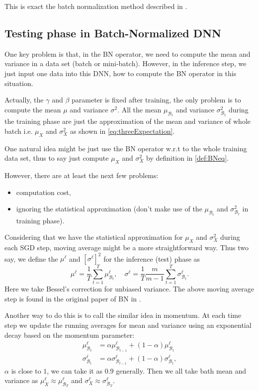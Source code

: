 This is exact the batch normalization method described in \cite{ioffe2015batch}.


\subsection{Testing phase in Batch-Normalized DNN}
One key problem is that, in the BN operator, we need to compute the mean and variance 
in a data set (batch or mini-batch). However, in the inference step, we just input one data 
into this DNN, how to compute the BN operator in this situation. 

Actually,  the $\gamma$ and $\beta$ parameter is fixed after training, the only problem is
to compute the mean $\mu$ and variance $\sigma^2$. 
All the mean $ \mu_{\mathcal B_t}  $ and variance $\sigma^2_{\mathcal B_t} $ during the training phase 
are just the approximation of the mean and variance of whole batch i.e.  $ \mu_{X}  $ and $\sigma^2_{X}$ 
as shown in \eqref{eq:threeExpectation}. 

One natural idea might be just use the BN operator w.r.t to the whole training data set, thus to say
just compute $\mu_X$ and $\sigma_X^2$ by definition in \eqref{def:BNeq}.


However, there are at least the next few problems:
\begin{itemize}
	\item computation cost,
	\item ignoring the statistical approximation (don't make use of the $ \mu_{\mathcal B_t}  $ and  $\sigma^2_{\mathcal B_t} $ in training phase).
\end{itemize}

Considering that we have the statistical approximation for $ \mu_{X}  $ and $\sigma^2_{X}$
during each SGD step, moving average might be a more straightforward way.
Thus two say, we define the $\mu^\ell$ and $[\sigma^\ell]^2$ for the inference (test) phase
as
\begin{equation}
\mu^\ell = \frac{1}{T}\sum_{t=1}^T \mu^\ell_{\mathcal B_t}, 
\quad \sigma^\ell =\frac{1}{T} \frac{m}{m-1}\sum_{t=1}^T\sigma^\ell_{\mathcal B_t}.
\end{equation}
Here we take Bessel's correction for unbiased variance.
The above moving average step is found in the original paper of BN in \cite{ioffe2015batch}. 

Another way to do this is to call the similar idea in momentum. 
At each time step we update the running averages for mean and variance using an exponential decay based on the momentum parameter:    
\begin{equation}
\begin{aligned}
\mu^\ell_{\mathcal B_t} &=\alpha \mu^\ell_{\mathcal B_{t-1}} + (1-\alpha)\mu^\ell_{\mathcal B_t} \\
\sigma^\ell_{\mathcal B_t} &=\alpha \sigma^\ell_{\mathcal B_{t-1}} + (1-\alpha)\sigma^\ell_{\mathcal B_t},
\end{aligned}
\end{equation}
$\alpha$ is close to $1$, we can take it as $0.9$ generally. Then we all take bath mean and variance as
$\mu^\ell_X  \approx \mu^\ell_{\mathcal B_T}$  and $\sigma^\ell_X  \approx \sigma^\ell_{\mathcal B_T}$.

